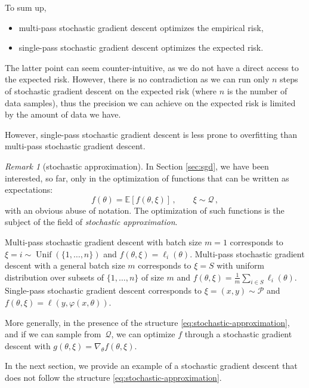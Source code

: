 \documentclass[11pt,reqno]{article}
\DeclareMathOperator{\Unif}{Unif}
\newcommand{\E}{\mathbb{E}}
\newcommand{\cP}{\mathcal{P}}
\newcommand{\cQ}{\mathcal{Q}}
\numberwithin{equation}{section}
\theoremstyle{plain}
\theoremstyle{definition}
\theoremstyle{remark}
\newtheorem{remark}[assumption]{Remark}
\begin{document}
To sum up,
\begin{itemize}
	\item multi-pass stochastic gradient descent optimizes the empirical risk, 
	\item single-pass stochastic gradient descent optimizes the expected risk. 
\end{itemize}
The latter point can seem counter-intuitive, as we do not have a direct access to the expected risk. However, there is no contradiction as we can run only $n$ steps of stochastic gradient descent on the expected risk (where $n$ is the number of data samples), thus the precision we can achieve on the expected risk is limited by the amount of data we have. 

However, single-pass stochastic gradient descent is less prone to overfitting than multi-pass stochastic gradient descent.


\begin{remark}[stochastic approximation]
In Section \ref{sec:sgd}, we have been interested, so far, only in the optimization of functions that can be written as expectations:
\begin{equation}
	\label{eq:stochastic-approximation}
	f(\theta) = \E\left[f(\theta, \xi)\right] \, , \qquad \xi \sim \cQ \, ,
\end{equation}
with an obvious abuse of notation. The optimization of such functions is the subject of the field of \emph{stochastic approximation}. 

Multi-pass stochastic gradient descent with batch size $m=1$ corresponds to $\xi = i \sim \Unif(\{1,\dots,n\})$ and $f(\theta, \xi) = \ell_i(\theta)$. Multi-pass stochastic gradient descent with a general batch size $m$ corresponds to $\xi = S$ with uniform distribution over subsets of $\{1, \dots, n\}$ of size $m$ and $f(\theta, \xi) = \frac{1}{m} \sum_{i \in S} \ell_i(\theta)$. Single-pass stochastic gradient descent corresponds to $\xi = (x,y) \sim \cP$ and $f(\theta, \xi) = \ell(y, \varphi(x, \theta))$.

More generally, in the presence of the structure \eqref{eq:stochastic-approximation}, and if we can sample from~$\cQ$, we can optimize $f$ through a stochastic gradient descent with $g(\theta, \xi) = \nabla_\theta f(\theta, \xi)$. 

In the next section, we provide an example of a stochastic gradient descent that does not follow the structure \eqref{eq:stochastic-approximation}. 
\end{remark}
\end{document}
